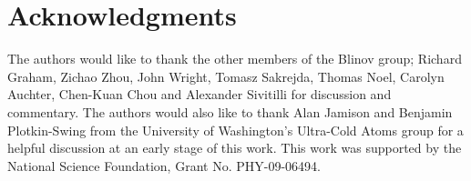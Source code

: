 \documentclass[%
 reprint,
 amsmath,amssymb,
 aps,
]{revtex4-1}
\begin{document}
\section{Acknowledgments}
\indent The authors would like to thank the other members of the Blinov group; Richard Graham, Zichao Zhou, John Wright, Tomasz Sakrejda, Thomas Noel, Carolyn Auchter, Chen-Kuan Chou and Alexander Sivitilli for discussion and commentary.  The authors would also like to thank Alan Jamison and Benjamin Plotkin-Swing from the University of Washington's Ultra-Cold Atoms group for a helpful discussion at an early stage of this work.  This work was supported by the National Science Foundation, Grant No. PHY-09-06494.
    
%    
%    
\end{document}
